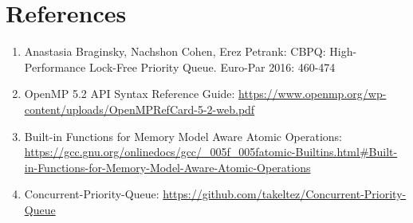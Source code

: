 \documentclass{article}
\begin{document}
  \section*{References}
    \begin{enumerate}
      \item\parbox{0.9\textwidth}{Anastasia Braginsky, Nachshon Cohen, Erez Petrank: CBPQ: High-Performance Lock-Free Priority Queue. Euro-Par 2016: 460-474}
      \item\parbox{0.9\textwidth}{OpenMP 5.2 API Syntax Reference Guide: \url{https://www.openmp.org/wp-content/uploads/OpenMPRefCard-5-2-web.pdf}}
      \item\parbox{0.9\textwidth}{Built-in Functions for Memory Model Aware Atomic Operations: \url{https://gcc.gnu.org/onlinedocs/gcc/_005f_005fatomic-Builtins.html\#Built-in-Functions-for-Memory-Model-Aware-Atomic-Operations}}
      \item\parbox{0.9\textwidth}{Concurrent-Priority-Queue: \url{https://github.com/takeltez/Concurrent-Priority-Queue}}
    \end{enumerate}
\end{document}
